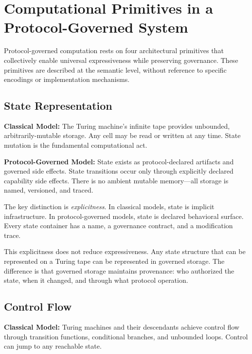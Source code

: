 \documentclass[11pt,a4paper]{article}
\begin{document}

\section{Computational Primitives in a Protocol-Governed System}
\label{sec:primitives}

Protocol-governed computation rests on four architectural primitives that collectively enable universal expressiveness while preserving governance. These primitives are described at the semantic level, without reference to specific encodings or implementation mechanisms.

\subsection{State Representation}

\textbf{Classical Model:} The Turing machine's infinite tape provides unbounded, arbitrarily-mutable storage. Any cell may be read or written at any time. State mutation is the fundamental computational act.

\textbf{Protocol-Governed Model:} State exists as protocol-declared artifacts and governed side effects. State transitions occur only through explicitly declared capability side effects. There is no ambient mutable memory---all storage is named, versioned, and traced.

The key distinction is \emph{explicitness}. In classical models, state is implicit infrastructure. In protocol-governed models, state is declared behavioral surface. Every state container has a name, a governance contract, and a modification trace.

This explicitness does not reduce expressiveness. Any state structure that can be represented on a Turing tape can be represented in governed storage. The difference is that governed storage maintains provenance: who authorized the state, when it changed, and through what protocol operation.

\subsection{Control Flow}

\textbf{Classical Model:} Turing machines and their descendants achieve control flow through transition functions, conditional branches, and unbounded loops. Control can jump to any reachable state.
\end{document}
